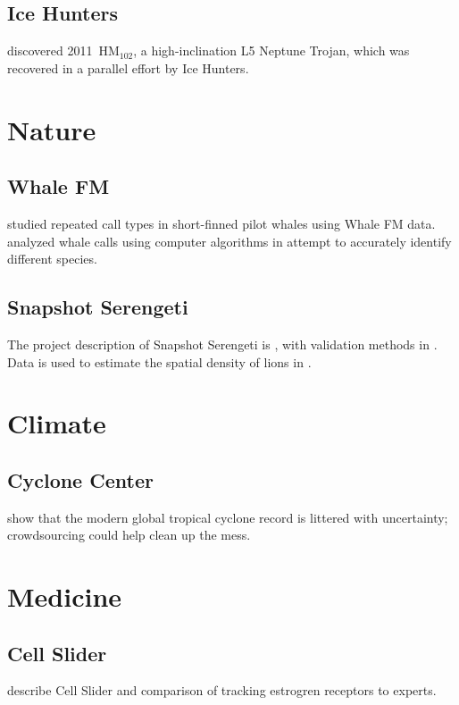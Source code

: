 \documentclass[twocolumn]{aastex6}
\begin{document}
\subsection{Ice Hunters}

\citet{par13} discovered 2011~HM$_{102}$, a high-inclination L5 Neptune Trojan, which was recovered in a parallel effort by Ice Hunters.

\section{Nature}

\subsection{Whale FM}
\citet{say13} studied repeated call types in short-finned pilot whales using Whale FM data. \citet{sha14} analyzed whale calls using computer algorithms in attempt to accurately identify different species.

\subsection{Snapshot Serengeti}

The project description of Snapshot Serengeti is \citet{swa15}, with validation methods in \citet{swa16}. Data is used to estimate the spatial density of lions in \citet{cus15}.

\section{Climate}

\subsection{Cyclone Center}

\citet{hen14} show that the modern global tropical cyclone record is littered with uncertainty; crowdsourcing could help clean up the mess.

\section{Medicine}

\subsection{Cell Slider}

\citet{can15} describe Cell Slider and comparison of tracking estrogren receptors to experts.
\end{document}
